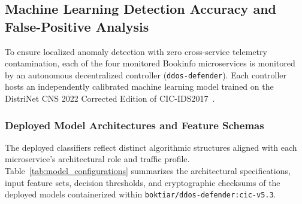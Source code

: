 
\subsection{Machine Learning Detection Accuracy and False-Positive Analysis}
\label{sec:ml_accuracy_fp_analysis}

To ensure localized anomaly detection with zero cross-service telemetry contamination, each of the four monitored Bookinfo microservices is monitored by an autonomous decentralized controller (\texttt{ddos-defender}). Each controller hosts an independently calibrated machine learning model trained on the DistriNet CNS 2022 Corrected Edition of CIC-IDS2017~\cite{cicids2017_corrected}.

\subsubsection{Deployed Model Architectures and Feature Schemas}
The deployed classifiers reflect distinct algorithmic structures aligned with each microservice's architectural role and traffic profile. Table~\ref{tab:model_configurations} summarizes the architectural specifications, input feature sets, decision thresholds, and cryptographic checksums of the deployed models containerized within \texttt{boktiar/ddos-defender:cic-v5.3}.

